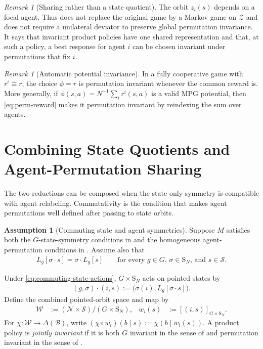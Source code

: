 \documentclass{article}
\theoremstyle{plain}
\theoremstyle{definition}
\newtheorem{assumption}[theorem]{Assumption}
\theoremstyle{remark}
\newtheorem{remark}[theorem]{Remark}
\newcommand{\N}{\mathcal{N}}
\newcommand{\St}{\mathcal{S}}
\newcommand{\orbit}[1]{[#1]}
\newcommand{\Sym}{\mathrm{S}}
\begin{document}
\begin{remark}[Sharing rather than a state quotient]
\label{rem:permutation-not-quotient}
The orbit $z_i(s)$ depends on a focal agent. Thus
 does not replace the original game by a
Markov game on $\mathcal Z$ and does not require a unilateral deviator to preserve
global permutation invariance. It says that invariant product policies have one
shared representation and that, at such a policy, a best response for agent $i$
can be chosen invariant under permutations that fix $i$.
\end{remark}

\begin{remark}[Automatic potential invariance]
\label{rem:perm-potential-automatic}
In a fully cooperative game with $r^i\equiv r$, the choice $\phi=r$ is
permutation invariant whenever the common reward is. More generally, if
$\phi(s,a)=N^{-1}\sum_i r^i(s,a)$ is a valid MPG potential, then
\eqref{eq:perm-reward} makes it permutation invariant by reindexing the sum over
agents.
\end{remark}

\section{Combining State Quotients and Agent-Permutation Sharing}
\label{sec:combined-reductions}

The two reductions can be composed when the state-only symmetry is compatible
with agent relabeling. Commutativity is the condition that makes agent
permutations well defined after passing to state orbits.

\begin{assumption}[Commuting state and agent symmetries]
\label{assumption:commuting-symmetries}
Suppose $M$ satisfies both the $G$-state-symmetry conditions in
 and the homogeneous
agent-permutation conditions in . Assume
also that
\begin{align}
  L_g[\sigma\mathbin{\cdot}s]
  =
  \sigma\mathbin{\cdot}L_g[s]
  \qquad
  \text{for every $g\in G$, $\sigma\in\Sym_N$, and $s\in\St$.}
  \label{eq:commuting-state-actions}
\end{align}
\end{assumption}

Under \eqref{eq:commuting-state-actions}, $G\times\Sym_N$ acts on pointed states
by
\begin{align*}
  (g,\sigma)\mathbin{\cdot}(i,s)
  :=
  \big(\sigma(i),L_g[\sigma\mathbin{\cdot}s]\big).
\end{align*}
Define the combined pointed-orbit space and map by
\begin{align}
  \mathcal W
  &:=
  (\N\times\St)/(G\times\Sym_N),&
  w_i(s)
  &:=
  \orbit{(i,s)}_{G\times\Sym_N}.
  \label{eq:combined-descriptor}
\end{align}
For $\chi:\mathcal W\to\Delta(\mathcal B)$, write
$(\chi\circ w_i)(b\mid s):=\chi(b\mid w_i(s))$.
A product policy is \emph{jointly invariant} if it is both $G$ invariant in
the sense of  and permutation invariant in the
sense of .
\end{document}
